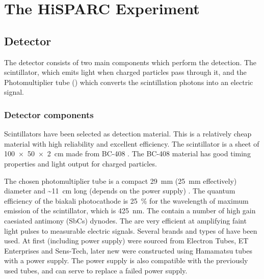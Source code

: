 \chapter{The HiSPARC Experiment}

\section{Detector}

The detector consists of two main components which perform the detection. The scintillator, which emits light when charged particles pass through it, and the Photomultiplier tube (\pmt) which converts the scintillation photons into an electric signal.

\subsection{Detector components}

Scintillators have been selected as detection material. This is a relatively cheap material with high reliability and excellent efficiency. The scintillator is a sheet of \SI[product-units=power]{100 x 50 x 2}{\centi\meter} made from BC-408 \cite{sgc2011bc408}. The BC-408 material has good timing properties and light output for charged particles.

The chosen photomultiplier tube \cite{et2010pmt} is a compact \SI{29}{\milli\meter} (\SI{25}{\milli\meter} effectively) diameter and \SI{~11}{\centi\meter} long (depends on the power supply) \pmt. The quantum efficiency of the biakali photocathode is \SI{25}{\percent} for the wavelength of maximum emission of the scintillator, which is \SI{425}{\nano\meter}. The \pmts contain a number of high gain caesiated antimony (SbCs) dynodes. The \pmts are very efficient at amplifying faint light pulses to measurable electric signals. Several brands and types of \pmts have been used. At first \pmts (including power supply) were sourced from Electron Tubes, ET Enterprises and Sens-Tech, later new \pmts were constructed using Hamamatsu tubes with a \nikhef power supply. The \nikhef power supply is also compatible with the previously used tubes, and can serve to replace a failed power supply.

